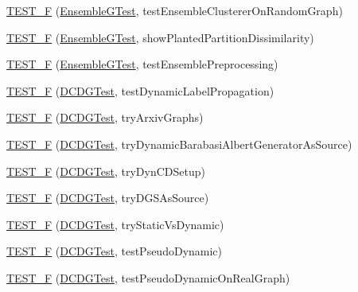 \begin{DoxyCompactItemize}
\item 
\hyperlink{namespace_networ_kit_a81aaba6126ba577a8cfc6d270d04736a}{T\-E\-S\-T\-\_\-\-F} (\hyperlink{class_networ_kit_1_1_ensemble_g_test}{Ensemble\-G\-Test}, test\-Ensemble\-Clusterer\-On\-Random\-Graph)
\item 
\hyperlink{namespace_networ_kit_abeaf134ff5af9938fda99c89d063145f}{T\-E\-S\-T\-\_\-\-F} (\hyperlink{class_networ_kit_1_1_ensemble_g_test}{Ensemble\-G\-Test}, show\-Planted\-Partition\-Dissimilarity)
\item 
\hyperlink{namespace_networ_kit_a2883f72f8f6b4c920264ab7bd31f8ac3}{T\-E\-S\-T\-\_\-\-F} (\hyperlink{class_networ_kit_1_1_ensemble_g_test}{Ensemble\-G\-Test}, test\-Ensemble\-Preprocessing)
\item 
\hyperlink{namespace_networ_kit_a2a496a9311b03769a3e510d9e4d6ebff}{T\-E\-S\-T\-\_\-\-F} (\hyperlink{class_networ_kit_1_1_d_c_d_g_test}{D\-C\-D\-G\-Test}, test\-Dynamic\-Label\-Propagation)
\item 
\hyperlink{namespace_networ_kit_a521962f569f3315291482b218b79d09e}{T\-E\-S\-T\-\_\-\-F} (\hyperlink{class_networ_kit_1_1_d_c_d_g_test}{D\-C\-D\-G\-Test}, try\-Arxiv\-Graphs)
\item 
\hyperlink{namespace_networ_kit_ac91fc01f6e5ff3ab3ded6bc094e00ebd}{T\-E\-S\-T\-\_\-\-F} (\hyperlink{class_networ_kit_1_1_d_c_d_g_test}{D\-C\-D\-G\-Test}, try\-Dynamic\-Barabasi\-Albert\-Generator\-As\-Source)
\item 
\hyperlink{namespace_networ_kit_afc4de2b0e06ce77be65e3ca8b26554d0}{T\-E\-S\-T\-\_\-\-F} (\hyperlink{class_networ_kit_1_1_d_c_d_g_test}{D\-C\-D\-G\-Test}, try\-Dyn\-C\-D\-Setup)
\item 
\hyperlink{namespace_networ_kit_aa395b416d94cf48ae7b763ba1d961219}{T\-E\-S\-T\-\_\-\-F} (\hyperlink{class_networ_kit_1_1_d_c_d_g_test}{D\-C\-D\-G\-Test}, try\-D\-G\-S\-As\-Source)
\item 
\hyperlink{namespace_networ_kit_a31db8472b73b19aa70156e70360a973c}{T\-E\-S\-T\-\_\-\-F} (\hyperlink{class_networ_kit_1_1_d_c_d_g_test}{D\-C\-D\-G\-Test}, try\-Static\-Vs\-Dynamic)
\item 
\hyperlink{namespace_networ_kit_a0cfa2d77161733219cb1d7db876b71c4}{T\-E\-S\-T\-\_\-\-F} (\hyperlink{class_networ_kit_1_1_d_c_d_g_test}{D\-C\-D\-G\-Test}, test\-Pseudo\-Dynamic)
\item 
\hyperlink{namespace_networ_kit_ab5466d0d8d45a518dffa2ae5b9de73c6}{T\-E\-S\-T\-\_\-\-F} (\hyperlink{class_networ_kit_1_1_d_c_d_g_test}{D\-C\-D\-G\-Test}, test\-Pseudo\-Dynamic\-On\-Real\-Graph)
\item 

\end{DoxyCompactItemize}
